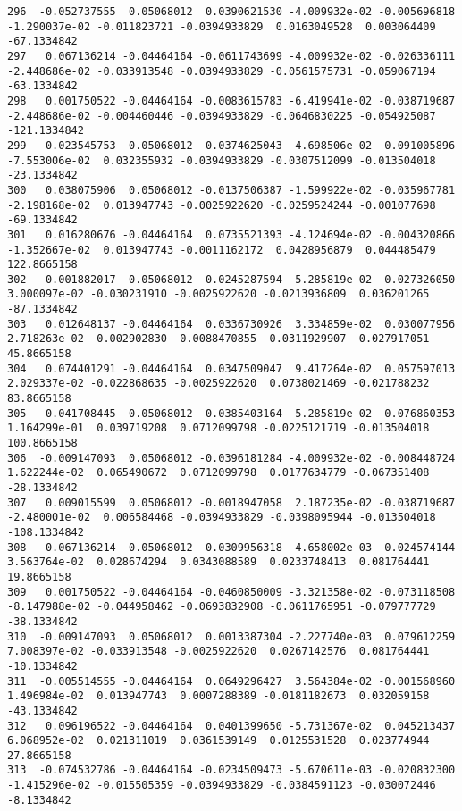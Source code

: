 \documentclass[15pt,a4paper,openright]{article}
\begin{document}
\begin{lstlisting}[language=AMPL, caption = data file]
296  -0.052737555  0.05068012  0.0390621530 -4.009932e-02 -0.005696818 -1.290037e-02 -0.011823721 -0.0394933829  0.0163049528  0.003064409  -67.1334842
297   0.067136214 -0.04464164 -0.0611743699 -4.009932e-02 -0.026336111 -2.448686e-02 -0.033913548 -0.0394933829 -0.0561575731 -0.059067194  -63.1334842
298   0.001750522 -0.04464164 -0.0083615783 -6.419941e-02 -0.038719687 -2.448686e-02 -0.004460446 -0.0394933829 -0.0646830225 -0.054925087 -121.1334842
299   0.023545753  0.05068012 -0.0374625043 -4.698506e-02 -0.091005896 -7.553006e-02  0.032355932 -0.0394933829 -0.0307512099 -0.013504018  -23.1334842
300   0.038075906  0.05068012 -0.0137506387 -1.599922e-02 -0.035967781 -2.198168e-02  0.013947743 -0.0025922620 -0.0259524244 -0.001077698  -69.1334842
301   0.016280676 -0.04464164  0.0735521393 -4.124694e-02 -0.004320866 -1.352667e-02  0.013947743 -0.0011162172  0.0428956879  0.044485479  122.8665158
302  -0.001882017  0.05068012 -0.0245287594  5.285819e-02  0.027326050  3.000097e-02 -0.030231910 -0.0025922620 -0.0213936809  0.036201265  -87.1334842
303   0.012648137 -0.04464164  0.0336730926  3.334859e-02  0.030077956  2.718263e-02  0.002902830  0.0088470855  0.0311929907  0.027917051   45.8665158
304   0.074401291 -0.04464164  0.0347509047  9.417264e-02  0.057597013  2.029337e-02 -0.022868635 -0.0025922620  0.0738021469 -0.021788232   83.8665158
305   0.041708445  0.05068012 -0.0385403164  5.285819e-02  0.076860353  1.164299e-01  0.039719208  0.0712099798 -0.0225121719 -0.013504018  100.8665158
306  -0.009147093  0.05068012 -0.0396181284 -4.009932e-02 -0.008448724  1.622244e-02  0.065490672  0.0712099798  0.0177634779 -0.067351408  -28.1334842
307   0.009015599  0.05068012 -0.0018947058  2.187235e-02 -0.038719687 -2.480001e-02  0.006584468 -0.0394933829 -0.0398095944 -0.013504018 -108.1334842
308   0.067136214  0.05068012 -0.0309956318  4.658002e-03  0.024574144  3.563764e-02  0.028674294  0.0343088589  0.0233748413  0.081764441   19.8665158
309   0.001750522 -0.04464164 -0.0460850009 -3.321358e-02 -0.073118508 -8.147988e-02 -0.044958462 -0.0693832908 -0.0611765951 -0.079777729  -38.1334842
310  -0.009147093  0.05068012  0.0013387304 -2.227740e-03  0.079612259  7.008397e-02 -0.033913548 -0.0025922620  0.0267142576  0.081764441  -10.1334842
311  -0.005514555 -0.04464164  0.0649296427  3.564384e-02 -0.001568960  1.496984e-02  0.013947743  0.0007288389 -0.0181182673  0.032059158  -43.1334842
312   0.096196522 -0.04464164  0.0401399650 -5.731367e-02  0.045213437  6.068952e-02  0.021311019  0.0361539149  0.0125531528  0.023774944   27.8665158
313  -0.074532786 -0.04464164 -0.0234509473 -5.670611e-03 -0.020832300 -1.415296e-02 -0.015505359 -0.0394933829 -0.0384591123 -0.030072446   -8.1334842

\end{lstlisting}
\end{document}

